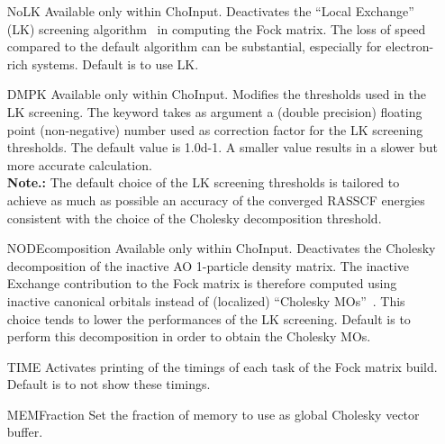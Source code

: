 \begin{keywordlist}
\begin{itemize}
\item[NoLK]
Available only within ChoInput. Deactivates the ``Local Exchange'' (LK) screening algorithm~\cite{Aquilante:07a} in computing
the Fock matrix. The loss of speed compared to the default algorithm can be substantial, especially for electron-rich systems.
Default is to use LK.
\item[DMPK]
Available only within ChoInput. Modifies the thresholds used in the LK screening.
The keyword takes as argument a (double precision) floating point (non-negative) number used
as correction factor for the LK screening thresholds.
The default value is 1.0d-1. A smaller value results in a slower but more accurate calculation.\\
{\bf Note.:} The default choice of the LK screening thresholds is tailored to achieve as much as possible an
accuracy of the converged RASSCF energies consistent with the choice of the Cholesky decomposition
threshold.
\item[NODEcomposition]
Available only within ChoInput. Deactivates the Cholesky decomposition of the inactive AO 1-particle density matrix.
The inactive Exchange contribution to the Fock matrix is therefore computed using inactive canonical orbitals
instead of (localized) ``Cholesky MOs''~\cite{Aquilante:06a}. This choice tends to lower the performances of the
LK screening.
Default is to perform this decomposition in order to obtain the Cholesky MOs.
\item[TIME]
Activates printing of the timings of each task of the Fock matrix build.
Default is to not show these timings.
\item[MEMFraction]
Set the fraction of memory to use as global Cholesky vector buffer.

\end{itemize}
\end{keywordlist}
